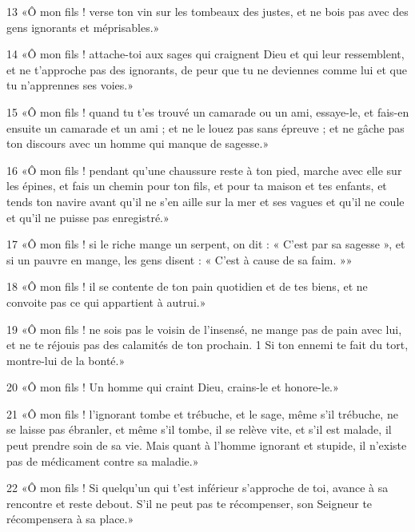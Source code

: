 \par 13 «Ô mon fils ! verse ton vin sur les tombeaux des justes, et ne bois pas avec des gens ignorants et méprisables.»

\par 14 «Ô mon fils ! attache-toi aux sages qui craignent Dieu et qui leur ressemblent, et ne t'approche pas des ignorants, de peur que tu ne deviennes comme lui et que tu n'apprennes ses voies.»

\par 15 «Ô mon fils ! quand tu t'es trouvé un camarade ou un ami, essaye-le, et fais-en ensuite un camarade et un ami ; et ne le louez pas sans épreuve ; et ne gâche pas ton discours avec un homme qui manque de sagesse.»

\par 16 «Ô mon fils ! pendant qu'une chaussure reste à ton pied, marche avec elle sur les épines, et fais un chemin pour ton fils, et pour ta maison et tes enfants, et tends ton navire avant qu'il ne s'en aille sur la mer et ses vagues et qu'il ne coule et qu'il ne puisse pas enregistré.»

\par 17 «Ô mon fils ! si le riche mange un serpent, on dit : « C'est par sa sagesse », et si un pauvre en mange, les gens disent : « C'est à cause de sa faim. »»

\par 18 «Ô mon fils ! il se contente de ton pain quotidien et de tes biens, et ne convoite pas ce qui appartient à autrui.»

\par 19 «Ô mon fils ! ne sois pas le voisin de l'insensé, ne mange pas de pain avec lui, et ne te réjouis pas des calamités de ton prochain. 1 Si ton ennemi te fait du tort, montre-lui de la bonté.»

\par 20 «Ô mon fils ! Un homme qui craint Dieu, crains-le et honore-le.»

\par 21 «Ô mon fils ! l'ignorant tombe et trébuche, et le sage, même s'il trébuche, ne se laisse pas ébranler, et même s'il tombe, il se relève vite, et s'il est malade, il peut prendre soin de sa vie. Mais quant à l’homme ignorant et stupide, il n’existe pas de médicament contre sa maladie.»

\par 22 «Ô mon fils ! Si quelqu'un qui t'est inférieur s'approche de toi, avance à sa rencontre et reste debout. S'il ne peut pas te récompenser, son Seigneur te récompensera à sa place.»

